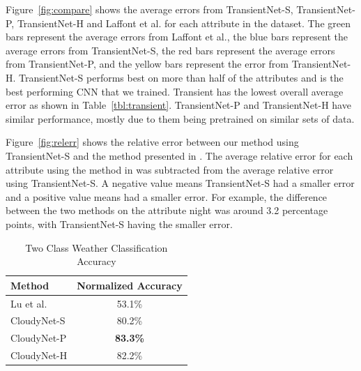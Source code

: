 \documentclass{article}
\newcommand{\figref}[1]{Figure~\ref{fig:#1}}
\newcommand{\tblref}[1]{Table~\ref{tbl:#1}}
\begin{document}
\figref{compare} shows the average errors from TransientNet-S, TransientNet-P, 
TransientNet-H and Laffont et al. for each attribute in the dataset.  The green bars 
represent the average errors from Laffont et al., the blue bars represent the average 
errors from TransientNet-S, the red bars represent the average errors from TransientNet-P, 
and the yellow bars represent the error from TransientNet-H. TransientNet-S performs best on 
more than half of the attributes and is the best performing CNN that we trained.  
Transient has the lowest overall average error as shown in \tblref{transient}.  TransientNet-P
and TransientNet-H have similar performance, mostly due to them being pretrained on similar 
sets of data.

\figref{relerr} shows the relative error between our method using TransientNet-S
and the method presented in \cite{Laffont14}.  The average relative error 
for each attribute using the method in \cite{Laffont14} was subtracted from
the average relative error using TransientNet-S.  A negative value means TransientNet-S
had a smaller error and a positive value means \cite{Laffont14} had a smaller
error.  For example, the difference between the two methods on the attribute
night was around 3.2 percentage points, with TransientNet-S having the smaller 
error.

 
%
%
%

\begin{table}[t]
	\centering
	\begin{tabular}{ | l | c | }
		\hline
			Method & Normalized Accuracy \\ \hline
			Lu et al. \cite{lutwoclass}& 53.1\% \\ \hline
			CloudyNet-S & 80.2\% \\ \hline
			CloudyNet-P & \textbf{83.3\%} \\ \hline
			CloudyNet-H & 82.2\% \\ 
		\hline
	\end{tabular}
	\caption{Two Class Weather Classification Accuracy}
	\label{tbl:twoclass}
\end{table}
\end{document}
